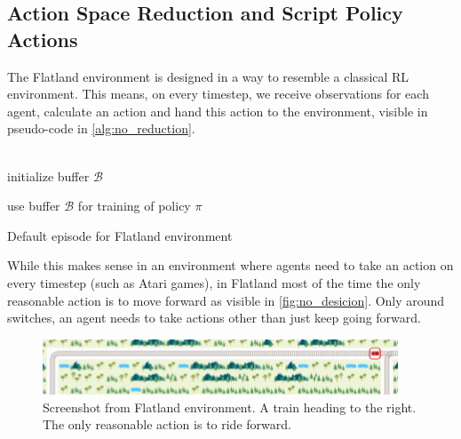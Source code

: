 \subsection*{Action Space Reduction and Script Policy Actions}\label{reduced_action_space}
The Flatland environment is designed in a way to resemble a classical RL environment. This means, on every timestep, we receive observations for each agent, calculate an action and hand this action to the environment, visible in pseudo-code in \autoref{alg:no_reduction}.\\\\
\begin{algorithm}[H]
	initialize buffer $\mathcal{B}$\\

	use buffer $\mathcal{B}$ for training of policy $\pi$
	\caption{Default episode for Flatland environment}
	\label{alg:no_reduction}
\end{algorithm}
While this makes sense in an environment where agents need to take an action on every timestep (such as Atari games), in Flatland most of the time the only reasonable action is to move forward as visible in \autoref{fig:no_desicion}. Only around switches, an agent needs to take actions other than just keep going forward.
\begin{figure}[H]
	\centering
	\includegraphics[width=300pt]{images/screenshot_no_decision.png}
	\caption{Screenshot from Flatland environment. A train heading to the right. The only reasonable action is to ride forward.}
	\label{fig:no_desicion}
\end{figure}
